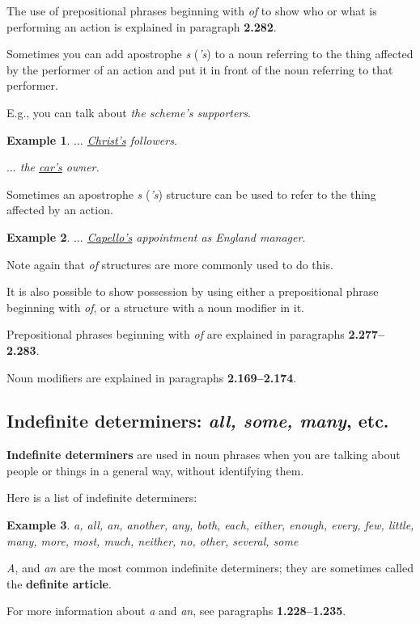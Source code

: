 \documentclass[oneside]{book}
\numberwithin{equation}{section}
\newtheorem{example}{Example}[section]
\begin{document}
The use of prepositional phrases beginning with \textit{of} to show who or what is performing an action is explained in paragraph \textbf{2.282}.

%
\noindent{} Sometimes you can add apostrophe \textit{s} (\textit{'s}) to a noun referring to the thing affected by the performer of an action and put it in front of the noun referring to that performer.

E.g., you can talk about \textit{the scheme's supporters}.
\begin{example}
    $\ldots$ \underline{Christ's} followers.
    
    $\ldots$ the \underline{car's} owner.
\end{example}
Sometimes an apostrophe \textit{s} (\textit{'s}) structure can be used to refer to the thing affected by an action.
\begin{example}
    $\ldots$ \underline{Capello's} appointment as England manager.
\end{example}
Note again that \textit{of} structures are more commonly used to do this.

%
\noindent{} It is also possible to show possession by using either a prepositional phrase beginning with \textit{of}, or a structure with a noun modifier in it.

%
Prepositional phrases beginning with \textit{of} are explained in paragraphs \textbf{2.277--2.283}.

Noun modifiers are explained in paragraphs \textbf{2.169--2.174}.

\subsection{Indefinite determiners: \textit{all, some, many}, etc.}
\noindent{} \textbf{Indefinite determiners} are used in noun phrases when you are talking about people or things in a general way, without identifying them.

%
Here is a list of indefinite determiners:
\begin{example}
    a, all, an, another, any, both, each, either, enough, every, few, little, many, more, most, much, neither, no, other, several, some
\end{example}
\textit{A}, and \textit{an} are the most common indefinite determiners; they are sometimes called the \textbf{definite article}.

For more information about \textit{a} and \textit{an}, see paragraphs \textbf{1.228--1.235}.
\end{document}
